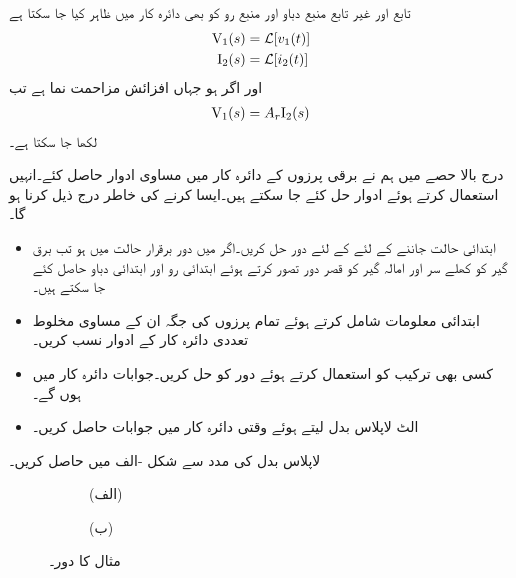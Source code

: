 تابع اور غیر تابع منبع دباو اور منبع رو کو بھی  دائرہ کار میں ظاہر کیا جا سکتا ہے
\begin{align}
{\ensuremath{{\textup{V}}}}_1(s)&=\mathcal{L}[v_1(t)]\\
{{\textup{I}}}_2(s)&=\mathcal{L}[i_2(t)]
\end{align}
اور اگر  ہو جہاں  افزائش مزاحمت نما ہے تب 
 \begin{align}
{\ensuremath{{\textup{V}}}}_1(s)=A_r {{\textup{I}}}_2(s)
\end{align}
لکھا جا سکتا ہے۔

درج بالا حصے میں ہم نے برقی پرزوں کے  دائرہ کار میں مساوی ادوار حاصل کئے۔انہیں استعمال کرتے ہوئے ادوار حل کئے جا سکتے ہیں۔ایسا کرنے کی خاطر درج ذیل کرنا ہو گا۔

\begin{itemize}
\item
ابتدائی حالت جاننے کے لئے  کے لئے دور حل کریں۔اگر  میں دور برقرار حالت میں ہو تب برق گیر کو کھلے سر اور امالہ گیر کو قصر دور تصور کرتے ہوئے ابتدائی رو اور ابتدائی دباو حاصل کئے جا سکتے ہیں۔
\item
ابتدائی معلومات شامل کرتے ہوئے تمام پرزوں کی جگہ ان کے مساوی مخلوط تعددی دائرہ کار کے ادوار نسب کریں۔
\item
کسی بھی ترکیب کو استعمال کرتے ہوئے دور کو حل کریں۔جوابات  دائرہ کار میں ہوں گے۔
\item
الٹ لاپلاس بدل لیتے ہوئے وقتی دائرہ کار میں جوابات حاصل کریں۔
\end{itemize}
لاپلاس بدل کی مدد سے شکل -الف میں  حاصل کریں۔
\begin{figure}
\centering
\begin{subfigure}{0.5\textwidth}
\centering
{}
\caption*{(الف)}
\end{subfigure}%
\begin{subfigure}{0.5\textwidth}
\centering
{}
\caption*{(ب)}
\end{subfigure}%
\caption{مثال  کا دور۔}
\label{شکل_لاپلاس_استعمال_مزاحمت_برق_گیر_الف}
\end{figure}

